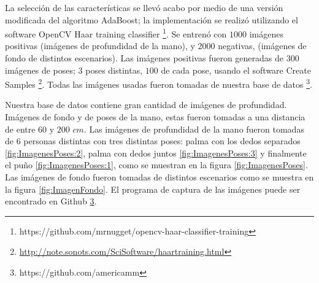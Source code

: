 La selección de las características se llev\'o acabo por medio de una versión modificada del algoritmo AdaBoost; la implementaci\'on se realiz\'o utilizando el software OpenCV Haar training classifier \footnote{{https://github.com/mrnugget/opencv-haar-classifier-training}}. Se entren\'o con $1000$ imágenes positivas (imágenes de profundidad de la mano), y $2000$ negativas, (imágenes de fondo de distintos escenarios). Las imágenes positivas fueron generadas de $300$ imágenes de poses; $3$ poses distintas, $100$ de cada pose, usando el software Create Samples \footnote{\url{http://note.sonots.com/SciSoftware/haartraining.html}}. Todas las imágenes usadas fueron tomadas de nuestra base de  datos \footnote{\label{myrepo} https://github.com/americamm}.

Nuestra base de datos contiene gran cantidad de imágenes de profundidad. Imágenes de fondo y de poses de la mano, estas fueron tomadas a una distancia de entre $60$ y $200$ $cm$. Las imágenes de profundidad de la mano fueron tomadas de $6$ personas distintas con tres distintas poses: palma con los dedos separados \ref{fig:ImagenesPoses:2}, palma con dedos juntos \ref{fig:ImagenesPoses:3} y finalmente el pu\~no \ref{fig:ImagenesPoses:1}, como se muestran en la figura \ref{fig:ImagenesPoses}. Las imágenes de fondo fueron tomadas de distintos escenarios como se muestra en la figura \ref{fig:ImagenFondo}. El programa de captura de las imágenes puede ser encontrado en Github \ref{myrepo}.  

